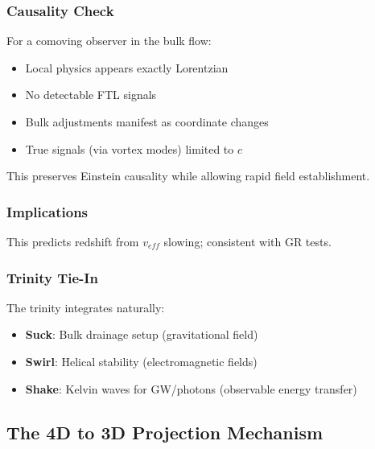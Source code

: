 \subsubsection{Causality Check}

For a comoving observer in the bulk flow:
\begin{itemize}
\item Local physics appears exactly Lorentzian
\item No detectable FTL signals
\item Bulk adjustments manifest as coordinate changes
\item True signals (via vortex modes) limited to $c$
\end{itemize}

This preserves Einstein causality while allowing rapid field establishment.

\subsubsection{Implications}

This predicts redshift from $v_{eff}$ slowing; consistent with GR tests.

\subsubsection{Trinity Tie-In}

The trinity integrates naturally:
\begin{itemize}
\item \textbf{Suck}: Bulk drainage setup (gravitational field)
\item \textbf{Swirl}: Helical stability (electromagnetic fields)
\item \textbf{Shake}: Kelvin waves for GW/photons (observable energy transfer)
\end{itemize}

\medskip
\noindent
{}
\medskip

\subsection{The 4D to 3D Projection Mechanism}
\label{sec:projection}

